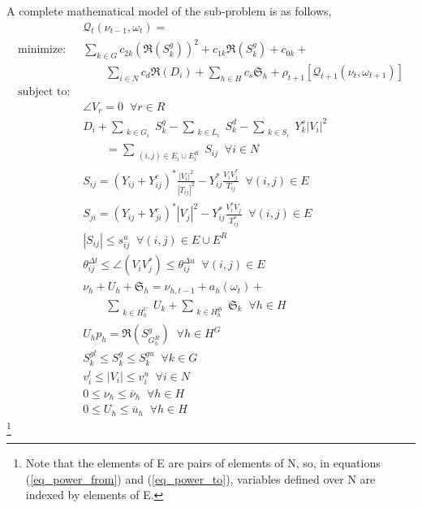 \documentclass{juliacon}
\begin{document}
A complete mathematical model of the sub-problem is as follows,
\begin{subequations} \label{AC_OPF}
\begin{align}
%
& \mathcal{Q}_t(\nu_{t-1},\omega_t) = \nonumber \\
%
\mbox{minimize: } & \sum_{k \in G} c_{2k} (\Re(S^g_k))^2 + c_{1k}\Re(S^g_k) + c_{0k} + \nonumber\\
& \qquad \sum_{i \in N} c_{d} \Re(D_i) +  \sum_{h \in H} c_{s} \mathfrak{S}_h + \rho_{t+1}[\mathcal{Q}_{t+1}(\nu_{t}, \omega_{t+1})] \label{eq_objective}\\
%
\mbox{subject to: } & \nonumber \\
& \angle V_{r} = 0  \;\; \forall r \in R \label{eq_ref_bus}\\
& D_i+ \sum_{\substack{k \in G_i}} S^g_k - \sum_{\substack{k \in L_i}} S^d_k - \sum_{\substack{k \in S_i}} Y^s_k |V_i|^2 \nonumber \\ 
& \qquad = \sum_{\substack{(i,j)\in E_i \cup E_i^R}} S_{ij} \;\; \forall i\in N \label{eq_kcl_shunt} \\
& S_{ij} = \left( Y_{ij} + Y^c_{ij}\right)^* \frac{|V_i|^2}{|{T}_{ij}|^2} - Y^*_{ij} \frac{V_i V^*_j}{{T}_{ij}} \;\; \forall (i,j)\in E \label{eq_power_from}\\
& S_{ji} = \left( Y_{ij} + Y^c_{ji} \right)^* |V_j|^2 - Y^*_{ij} \frac{V^*_i V_j}{{T}^*_{ij}} \;\; \forall (i,j)\in E \label{eq_power_to}\\
& |S_{ij}| \leq s^u_{ij} \;\; \forall (i,j) \in E \cup E^R \label{eq_thermal_limit}\\
& \theta^{\Delta l}_{ij} \leq \angle (V_i V^*_j) \leq \theta^{\Delta u}_{ij} \;\; \forall (i,j) \in E \label{eq_angle_difference}  \\
& \nu_h + U_h + \mathfrak{S}_h = \nu_{h,t-1} + a_h(\omega_t) + \nonumber \\ 
& \qquad  \sum_{\substack{k \in H^U_h}} U_k + \sum_{\substack{k \in H^{\mathfrak{S}}_h}} \mathfrak{S}_k \;\; \forall h \in H \label{eq_hydro_balance} \\
& U_h p_h = \Re(S^g_{G^H_h}) \;\; \forall h \in H^G \label{eq_hydro_generation} \\
& S^{gl}_k \leq S^g_k \leq S^{gu}_k \;\; \forall k \in G  \label{eq_gen_bounds}\\
& v^l_i \leq |V_i| \leq v^u_i \;\; \forall i \in N \label{eq_voltage_bounds}\\
& 0 \leq \nu_h \leq \overline{\nu}_h \;\; \forall h \in H \label{eq_volume_limit}\\
& 0 \leq U_h \leq \overline{u}_h \;\; \forall h \in H \label{eq_outflow_limit}
%
\end{align}
\end{subequations}
\footnote{Note that the elements of E are pairs of elements of N, so, in equations (\ref{eq_power_from}) and (\ref{eq_power_to}), variables defined over N are indexed by elements of E.}
\end{document}

